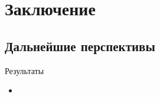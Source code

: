 \section{Заключение}
\subsection{Дальнейшие перспективы}

\begin{frame}
	\begin{center}
		\large
		Результаты
	\end{center}
	\begin{itemize}
		\item
	\end{itemize}
\end{frame}
